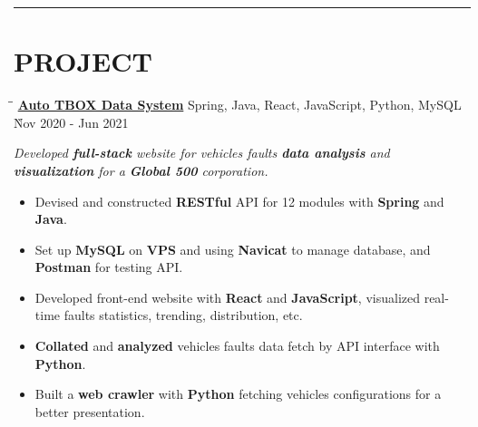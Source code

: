 \documentclass{res}
\begin{document}
\begin{resume}
\vspace{+0.05in}

\vspace{-12pt}
\hspace{-0.55in}
\noindent\rule[0.25\baselineskip]{19.36cm}{0.5pt}    
        
\vspace{-0.2in}
\section{PROJECT}

    \vspace{0.00in}	 
    \begin{tabbing}
    \hspace{2.391in}\= \hspace{3in}\= \kill %
    \href{https://github.com/DolorHunter/AutoTBOXDataSystem}{\bf Auto TBOX Data System}  \> 
                Spring, Java, React, JavaScript, Python, MySQL \` Nov 2020 - Jun 2021 \\
    \end{tabbing}\vspace{-20pt}      %
    \vspace{-0.1in}
    \textit{Developed {\bf full-stack} website for vehicles faults {\bf data analysis} and
             {\bf visualization} for a {\bf Global 500} corporation.}
    \vspace{-0.1in}
    \begin{itemize} \itemsep 1.5pt %
        \item Devised and constructed {\bf RESTful} API for 12 modules with 
                {\bf Spring} and {\bf Java}.
        \item Set up {\bf MySQL} on {\bf VPS} and using {\bf Navicat} to manage database, and 
                {\bf Postman} for testing API.
        \item Developed front-end website with {\bf React} and {\bf JavaScript}, visualized real-time faults statistics,  
                trending, distribution, etc.
        \item {\bf Collated} and {\bf analyzed} vehicles faults data fetch by API interface with 
                {\bf Python}.
        \item Built a {\bf web crawler} with {\bf Python} fetching vehicles configurations for 
                a better presentation.
    \end{itemize}


\end{resume}
\end{document}
